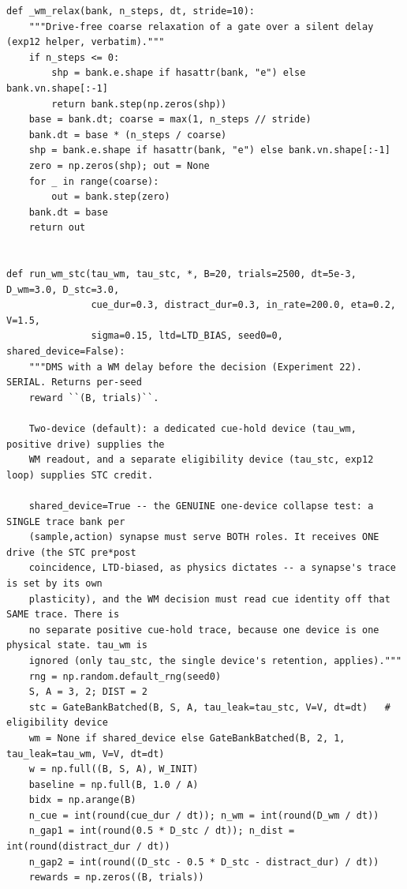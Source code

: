 \begin{lstlisting}[caption={mrl\_trace/extensions.py},label={lst:siox-src-extensions}]
def _wm_relax(bank, n_steps, dt, stride=10):
    """Drive-free coarse relaxation of a gate over a silent delay (exp12 helper, verbatim)."""
    if n_steps <= 0:
        shp = bank.e.shape if hasattr(bank, "e") else bank.vn.shape[:-1]
        return bank.step(np.zeros(shp))
    base = bank.dt; coarse = max(1, n_steps // stride)
    bank.dt = base * (n_steps / coarse)
    shp = bank.e.shape if hasattr(bank, "e") else bank.vn.shape[:-1]
    zero = np.zeros(shp); out = None
    for _ in range(coarse):
        out = bank.step(zero)
    bank.dt = base
    return out


def run_wm_stc(tau_wm, tau_stc, *, B=20, trials=2500, dt=5e-3, D_wm=3.0, D_stc=3.0,
               cue_dur=0.3, distract_dur=0.3, in_rate=200.0, eta=0.2, V=1.5,
               sigma=0.15, ltd=LTD_BIAS, seed0=0, shared_device=False):
    """DMS with a WM delay before the decision (Experiment 22). SERIAL. Returns per-seed
    reward ``(B, trials)``.

    Two-device (default): a dedicated cue-hold device (tau_wm, positive drive) supplies the
    WM readout, and a separate eligibility device (tau_stc, exp12 loop) supplies STC credit.

    shared_device=True -- the GENUINE one-device collapse test: a SINGLE trace bank per
    (sample,action) synapse must serve BOTH roles. It receives ONE drive (the STC pre*post
    coincidence, LTD-biased, as physics dictates -- a synapse's trace is set by its own
    plasticity), and the WM decision must read cue identity off that SAME trace. There is
    no separate positive cue-hold trace, because one device is one physical state. tau_wm is
    ignored (only tau_stc, the single device's retention, applies)."""
    rng = np.random.default_rng(seed0)
    S, A = 3, 2; DIST = 2
    stc = GateBankBatched(B, S, A, tau_leak=tau_stc, V=V, dt=dt)   # eligibility device
    wm = None if shared_device else GateBankBatched(B, 2, 1, tau_leak=tau_wm, V=V, dt=dt)
    w = np.full((B, S, A), W_INIT)
    baseline = np.full(B, 1.0 / A)
    bidx = np.arange(B)
    n_cue = int(round(cue_dur / dt)); n_wm = int(round(D_wm / dt))
    n_gap1 = int(round(0.5 * D_stc / dt)); n_dist = int(round(distract_dur / dt))
    n_gap2 = int(round((D_stc - 0.5 * D_stc - distract_dur) / dt))
    rewards = np.zeros((B, trials))


\end{lstlisting}
